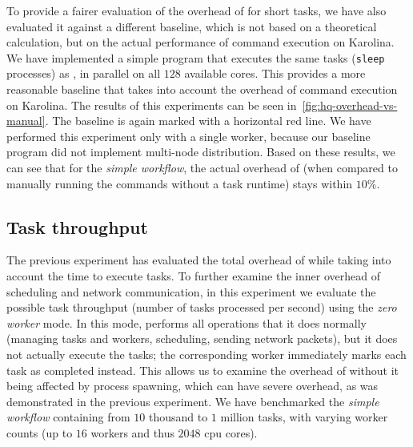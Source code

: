 To provide a fairer evaluation of the overhead of \hyperqueue{} for short tasks, we have
also evaluated it against a different baseline, which is not based on a theoretical calculation,
but on the actual performance of command execution on Karolina. We have implemented a simple
program that executes the same tasks (\texttt{sleep} processes) as
\hyperqueue{}, in parallel on all $128$ available cores. This provides a
more reasonable baseline that takes into account the overhead of command execution on Karolina. The
results of this experiments can be seen in~\autoref{fig:hq-overhead-vs-manual}. The baseline is again marked
with a horizontal red line. We have performed this experiment only with a single worker, because
our baseline program did not implement multi-node distribution. Based on these results, we can see
that for the \emph{simple workflow}, the actual overhead of
\hyperqueue{} (when compared to manually running the commands without a task runtime) stays within
$10\%$.

\subsection{Task throughput}
\label{sec:hq-exp-task-throughput}
The previous experiment has evaluated the total overhead of \hyperqueue{} while taking
into account the time to execute tasks. To further examine the inner overhead of scheduling and
network communication, in this experiment we evaluate the possible task throughput (number of tasks
processed per second) using the \emph{zero worker} mode. In this mode, \hq{}
performs all operations that it does normally (managing tasks and workers, scheduling, sending
network packets), but it does not actually execute the tasks; the corresponding worker immediately
marks each task as completed instead. This allows us to examine the overhead of
\hyperqueue{} without it being affected by process spawning, which can have severe
overhead, as was demonstrated in the previous experiment. We have benchmarked the
\emph{simple workflow} containing from $10$ thousand to $1$ million tasks, with varying worker
counts (up to $16$ workers and thus $2048$ \gls{cpu} cores).

